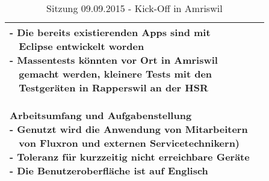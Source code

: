 \begin{table}[H]
\begin{tabularx}{\textwidth}{| l | X |}
{- Die bereits existierenden Apps sind mit\\~ Eclipse entwickelt worden\\
- Massentests könnten vor Ort in Amriswil\\~ gemacht werden, kleinere Tests mit den\\~ Testgeräten in Rapperswil an der HSR\\
\\
\textbf{Arbeitsumfang und Aufgabenstellung}\\
- Genutzt wird die Anwendung von Mitarbeitern\\~ von Fluxron und externen Servicetechnikern)\\
- Toleranz für kurzzeitig nicht erreichbare Geräte\\
- Die Benutzeroberfläche ist auf Englisch\\
}
\\ \hline
\end{tabularx}
\caption{Sitzung 09.09.2015 - Kick-Off in Amriswil}
\end{table}